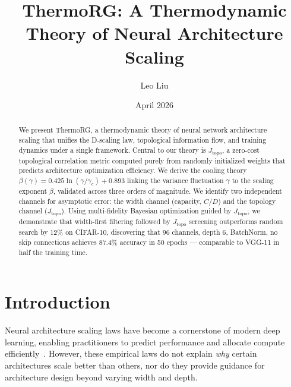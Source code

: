 \documentclass[11pt, a4paper]{article}
\theoremstyle{plain}
\begin{document}
\title{ThermoRG: A Thermodynamic Theory of Neural Architecture Scaling}

\author{Leo Liu}

\date{April 2026}

\maketitle

\begin{abstract}
We present ThermoRG, a thermodynamic theory of neural network architecture scaling that unifies the D-scaling law, topological information flow, and training dynamics under a single framework. Central to our theory is $J_{\mathrm{topo}}$, a zero-cost topological correlation metric computed purely from randomly initialized weights that predicts architecture optimization efficiency. We derive the cooling theory $\beta(\gamma) = 0.425\ln(\gamma/\gamma_c) + 0.893$ linking the variance fluctuation $\gamma$ to the scaling exponent $\beta$, validated across three orders of magnitude. We identify two independent channels for asymptotic error: the width channel (capacity, $C/D$) and the topology channel ($J_{\mathrm{topo}}$). Using multi-fidelity Bayesian optimization guided by $J_{\mathrm{topo}}$, we demonstrate that width-first filtering followed by $J_{\mathrm{topo}}$ screening outperforms random search by 12\% on CIFAR-10, discovering that 96 channels, depth 6, BatchNorm, no skip connections achieves 87.4\% accuracy in 50 epochs — comparable to VGG-11 in half the training time.
\end{abstract}

\section{Introduction}

Neural architecture scaling laws have become a cornerstone of modern deep learning, enabling practitioners to predict performance and allocate compute efficiently~\citep{kaplan2020scaling,hoffmann2022training}. However, these empirical laws do not explain \emph{why} certain architectures scale better than others, nor do they provide guidance for architecture design beyond varying width and depth.
\end{document}
